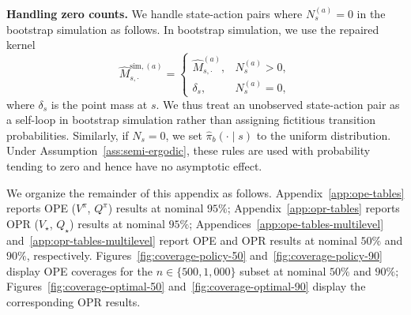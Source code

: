 \documentclass{article}
\numberwithin{equation}{section}
\begin{document}
\noindent


\textbf{Handling zero counts.} We handle state-action pairs where $N_s^{(a)}=0$ in the bootstrap simulation as follows.
In bootstrap simulation, we use the repaired kernel
\[
\hat M^{\mathrm{sim},(a)}_{s,\cdot}
=
\begin{cases}
\hat M^{(a)}_{s,\cdot}, & N_s^{(a)}>0,\\
\delta_s, & N_s^{(a)}=0,
\end{cases}
\]
where \(\delta_s\) is the point mass at \(s\).
We thus treat an unobserved state-action pair as a self-loop in bootstrap simulation rather than assigning fictitious transition probabilities. 
Similarly, if \(N_s=0\), we set
\(\hat\pi_b(\cdot\mid s)\) to the uniform distribution. Under Assumption~\ref{ass:semi-ergodic}, these rules are used with probability
tending to zero and hence have no asymptotic effect. 

We organize the remainder of this appendix as follows.
Appendix~\ref{app:ope-tables} reports OPE ($V^\pi$, $Q^\pi$) results at nominal $95\%$;
Appendix~\ref{app:opr-tables} reports OPR ($V_\star$, $Q_\star$) results at nominal
$95\%$;
Appendices~\ref{app:ope-tables-multilevel} and~\ref{app:opr-tables-multilevel} report OPE and OPR results at nominal $50\%$ and $90\%$, respectively.
Figures~\ref{fig:coverage-policy-50} and~\ref{fig:coverage-policy-90} display OPE coverages for the $n\in\{500,1{,}000\}$ subset at nominal $50\%$ and $90\%$;
Figures~\ref{fig:coverage-optimal-50} and~\ref{fig:coverage-optimal-90} display the corresponding OPR results.
\end{document}
